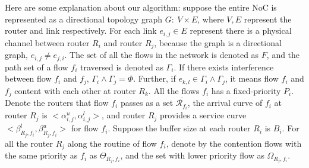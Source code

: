 \documentclass[10pt,journal]{IEEEtran}
\begin{document}
Here are some explanation about our algorithm: suppose the entire NoC is represented as a directional topology graph $G:\ V\times E$, where $V,E$ represent the router and link respectively. For each link $e_{i,j}\in E$ represent there is a physical channel between router $R_i$ and router $R_j$, because the graph is a directional graph, $e_{i,j}\neq e_{j,i}$. The set of all the flows in the network is denoted as $F$, and the path set of a flow $f_i$ traversed is denoted as $\Gamma_i$. If there exists interference between flow $f_i$ and $f_j$, $\Gamma_i\wedge\Gamma_j=\Phi$. Further, if $e_{k,l}\in\Gamma_i\wedge\Gamma_j$, it means flow $f_i$ and $f_j$ content with each other at router $R_k$. All the flows $f_i$ has a fixed-priority $P_i$. Denote the routers that flow $f_i$ passes as a set $\overline{\mathcal{R}_{f_i}}$, the arrival curve of $f_i$ at router $R_j$ is $<\alpha_{i,j}^u,\alpha_{i,j}^l>$, and router $R_j$ provides a service curve $<\beta_{R_j,f_i}^l,\beta_{R_j,f_i}^u>$ for flow $f_i$. Suppose the buffer size at each router $R_i$ is $B_i$. For all the router $R_j$ along the routine of flow $f_i$, denote by the contention flows with the same priority as $f_i$ as $\Theta_{R_j,f_i}$, and the set with lower priority flow as $\Omega_{R_j,f_i}$.
\end{document}
